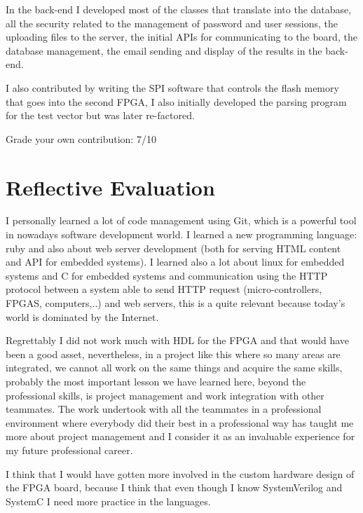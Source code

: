 In the back-end I developed most of the classes that translate into the database, all the security related to the management of password and user sessions, the uploading 
files to the server, the initial APIs for communicating to the board, the database management, the email sending and display of the results in the back-end.  

I also contributed by writing the SPI software that controls the flash memory that goes into the second FPGA, I also initially developed the parsing program for the test 
vector but was later re-factored. 

Grade your own contribution: 7/10 

\section{Reflective Evaluation}

I personally learned a lot of code management using Git, which is a powerful tool in nowadays software development world. I learned a new programming language: ruby 
and also about web server development (both for serving HTML content and API for embedded systems). I learned also a lot about linux for embedded systems and C for 
embedded systems and communication using the HTTP protocol between a system able to send HTTP request (micro-controllers, FPGAS, computers,..) and web servers, this
is a quite relevant because today's world is dominated by the Internet.

Regrettably I did not work much with HDL for the FPGA and that would have been a good asset, nevertheless, in a project like this where so many areas are integrated,
we cannot all work on the same things and acquire the same skills, probably the most important lesson we have learned here, beyond the professional skills, is project
management and work integration with other teammates. The work undertook with all the teammates in a professional environment where everybody did their best in a 
professional way has taught me more about project management and I consider it as an invaluable experience for my future professional career.

I think that I would have gotten more involved in the custom hardware design of the FPGA board, because I think that even though I know SystemVerilog and SystemC I need 
more practice in the languages.    
